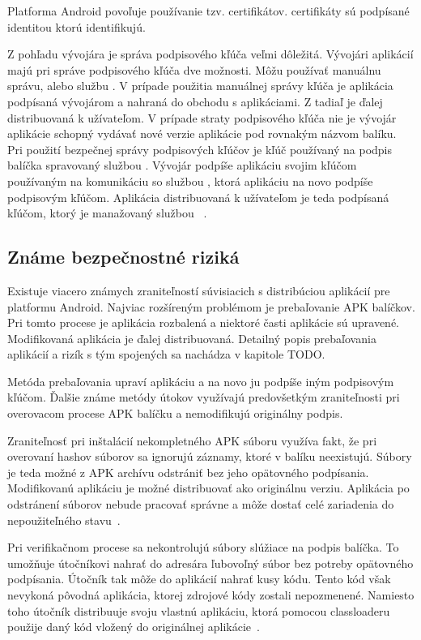 Platforma Android povoľuje používanie tzv.  certifikátov.  certifikáty sú podpísané identitou ktorú identifikujú. 

Z pohľadu vývojára je správa podpisového kľúča veľmi dôležitá. Vývojári aplikácií majú pri správe podpisového kľúča dve možnosti. Môžu používať manuálnu správu, alebo službu . 
V prípade použitia manuálnej správy kľúča je aplikácia podpísaná vývojárom a nahraná do obchodu s aplikáciami. Z tadiaľ je ďalej distribuovaná k užívateľom. V prípade straty podpisového kľúča nie je vývojár aplikácie schopný vydávať nové verzie aplikácie pod rovnakým názvom balíku.
Pri použití bezpečnej správy podpisových kľúčov  je kľúč používaný na podpis balíčka spravovaný službou  . Vývojár podpíše aplikáciu svojim kľúčom používaným na komunikáciu so službou  , ktorá aplikáciu na novo podpíše podpisovým kľúčom. Aplikácia distribuovaná k užívateľom je teda podpísaná kľúčom, ktorý je manažovaný službou ~\cite{NT0FrzQIkOAYbG2G}. 


\subsection{Známe bezpečnostné riziká}

Existuje viacero známych zraniteľností súvisiacich s distribúciou aplikácií  pre platformu Android. Najviac rozšíreným problémom je prebaľovanie APK balíčkov. Pri tomto procese je aplikácia rozbalená a niektoré časti aplikácie sú upravené. Modifikovaná aplikácia je ďalej distribuovaná. Detailný popis prebaľovania aplikácií a rizík s tým spojených sa nachádza v kapitole TODO.

Metóda prebaľovania upraví aplikáciu a na novo ju podpíše iným podpisovým kľúčom. Ďalšie známe metódy útokov využívajú predovšetkým zraniteľnosti pri overovacom procese APK balíčku a nemodifikujú originálny podpis. 

Zraniteľnosť pri inštalácií nekompletného APK súboru využíva fakt, že pri overovaní hashov súborov sa ignorujú záznamy, ktoré v balíku neexistujú. Súbory je teda možné z APK archívu odstrániť bez jeho opätovného podpísania. Modifikovanú aplikáciu je možné distribuovať ako originálnu verziu. Aplikácia po odstránení súborov nebude pracovať správne a môže dostať celé zariadenia do nepoužiteľného stavu~\cite{A7idcou1z6WqKvQZ}.

Pri verifikačnom procese sa nekontrolujú súbory slúžiace na podpis balíčka. To umožňuje útočníkovi nahrať do adresára  ľubovoľný súbor bez potreby opätovného podpísania. Útočník tak môže do aplikácií nahrať kusy kódu. Tento kód však nevykoná pôvodná aplikácia, ktorej zdrojové kódy zostali nepozmenené. Namiesto toho útočník distribuuje svoju vlastnú aplikáciu, ktorá pomocou classloaderu použije daný kód vložený do originálnej aplikácie~\cite{A7idcou1z6WqKvQZ}.
